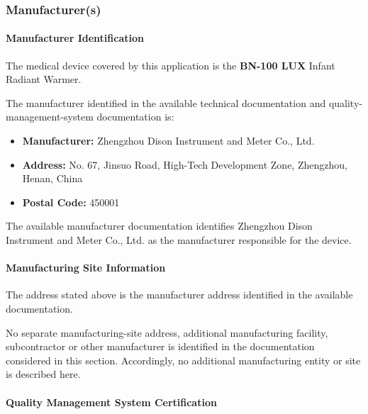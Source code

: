 ﻿

\hypertarget{p3-2-2-1}{}

\subsubsection{Manufacturer(s)}

\paragraph{Manufacturer Identification}

The medical device covered by this application is the
\textbf{BN-100 LUX} Infant Radiant Warmer.

The manufacturer identified in the available technical
documentation and quality-management-system documentation is:

\begin{itemize}
    \item \textbf{Manufacturer:} Zhengzhou Dison Instrument and Meter Co., Ltd.
    \item \textbf{Address:} No. 67, Jinsuo Road, High-Tech Development Zone,
    Zhengzhou, Henan, China
    \item \textbf{Postal Code:} 450001
\end{itemize}

The available manufacturer documentation identifies
Zhengzhou Dison Instrument and Meter Co., Ltd. as the manufacturer
responsible for the device.

\paragraph{Manufacturing Site Information}

The address stated above is the manufacturer address identified
in the available documentation.

No separate manufacturing-site address, additional manufacturing
facility, subcontractor or other manufacturer is identified in
the documentation considered in this section. Accordingly, no
additional manufacturing entity or site is described here.

\paragraph{Quality Management System Certification}

